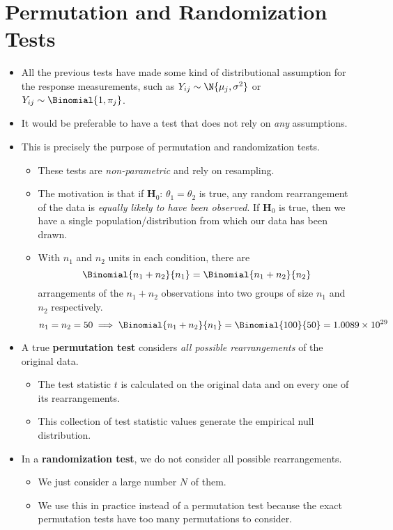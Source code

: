 \section{Permutation and Randomization Tests}
\begin{itemize}
      \item All the previous tests have made some kind of distributional assumption
            for the response measurements, such as $ Y_{ij} \sim \N{\mu_j,\sigma^2} $ or
            $ Y_{ij}\sim \Binomial{1,\pi_j} $.
      \item It would be preferable to have a test that does not rely on \emph{any}
            assumptions.
      \item This is precisely the purpose of permutation and randomization tests.
            \begin{itemize}
                  \item These tests are \emph{non-parametric} and rely on resampling.
                  \item The motivation is that if $ \mathbf{H}_0 $: $ \theta_1=\theta_2 $
                        is true, any random rearrangement of the data is \emph{equally likely
                              to have been observed}. If $ \mathbf{H}_0 $ is true, then we have a single population/distribution
                        from which our data has been drawn.
                  \item With $ n_1 $ and $ n_2 $ units in each condition, there are
                        \[ \Binomial{n_1+n_2}{n_1}=\Binomial{n_1+n_2}{n_2} \]
                        arrangements of the $ n_1+n_2 $ observations into two groups of size $ n_1 $
                        and $ n_2 $ respectively.
                        \[ n_1=n_2=50\implies\Binomial{n_1+n_2}{n_1}=\Binomial{100}{50}=1.0089\times 10^{29} \]
            \end{itemize}
      \item A true \textbf{permutation test} considers \emph{all possible rearrangements}
            of the original data.
            \begin{itemize}
                  \item The test statistic $ t $ is calculated on the original data and on every one of
                        its rearrangements.
                  \item This collection of test statistic values generate the empirical null distribution.
            \end{itemize}
      \item In a \textbf{randomization test}, we do not
            consider all possible rearrangements.
            \begin{itemize}
                  \item We just consider a large number $ N $ of them.
                  \item We use this in practice instead of a permutation test because
                        the exact permutation tests have too many permutations to consider.
            \end{itemize}
\end{itemize}
